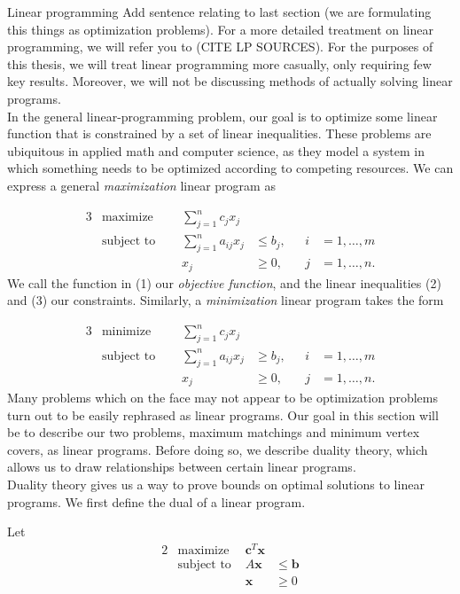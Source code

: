 \documentclass[11pt]{article}
\renewcommand{\'}{^{'}}
\newenvironment{definition}[2][Definition]{\begin{trivlist}
\item[\hskip \labelsep {\bfseries #1}\hskip \labelsep {\bfseries #2.}]}{\end{trivlist}}
\begin{document}
\begin{section}{Linear programming}
	Add sentence relating to last section (we are formulating this things as optimization problems).
	For a more detailed treatment on linear programming, we will refer you to (CITE LP SOURCES).
	For the purposes of this thesis, we will treat linear programming more casually, only requiring 
	few key results. Moreover, we will not be discussing methods of actually solving linear 
	programs. \\
	In the general linear-programming problem, our goal is to optimize some linear function that 
	is constrained by a set of linear inequalities. These problems are ubiquitous in applied math 
	and computer science, as they model a system in which something needs to be optimized according 
	to competing resources. We can express a general \emph{maximization} linear program as

	\begin{alignat}{3}
		& \text{maximize } & \sum_{j=1}^{n} c_{j} x_{j}& \\
		& \text{subject to } \quad & \sum_{j=1}^{n} a_{ij} x_{j} & \leq b_{j}, & i & = 1, \dots 
		, m \\
				&& x_{j} & \geq 0, \quad & j & = 1, \dots, n.
	\end{alignat}
	We call the function in (1) our \emph{objective function}, and the linear inequalities (2) and 
	(3) our constraints. Similarly, a \emph{minimization} linear program takes the form

	\begin{alignat}{3}
		& \text{minimize } & \sum_{j=1}^{n} c_{j} x_{j}& \\
		& \text{subject to } \quad & \sum_{j=1}^{n} a_{ij} x_{j} & \geq b_{j}, & i & = 1, \dots 
		, m \\
				&& x_{j} & \geq 0, \quad & j & = 1, \dots, n.
	\end{alignat}
	Many problems which on the face may not appear to be optimization problems turn out to be 
	easily rephrased as linear programs. Our goal in this section will 
	be to describe our two problems, maximum matchings and minimum vertex covers, as linear 
	programs. Before doing so, we describe duality theory, which allows us to draw relationships 
	between certain linear programs.\\

	Duality theory gives us a way to prove bounds on optimal solutions to linear programs. We first 
	define the dual of a linear program.

	\begin{definition}{(Dual)}
		Let 
		\begin{alignat*}{2}
			& \text{maximize} & \mathbf{c}^{T}\mathbf{x} \\
			& \text{subject to } & A\mathbf{x} & \leq \mathbf{b} \\
			&& \mathbf{x} &\geq 0
		\end{alignat*}


\end{definition}
\end{section}
\end{document}
